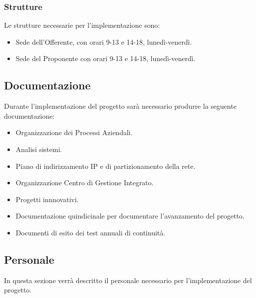             \subsubsection{Strutture}
            	Le strutture necessarie per l'implementazione sono:
               	\begin{itemize}
               		\item Sede dell'Offerente, con orari 9-13 e 14-18, lunedì-venerdì.
                    \item Sede del Proponente con orari 9-13 e 14-18, lunedì-venerdì.
               	\end{itemize}

			\subsection{Documentazione}
            	Durante l'implementazione del progetto sarà necessario produrre la seguente documentazione:
                \begin{itemize}
                	\item Organizzazione dei Processi Aziendali.
					\item Analisi sistemi.
					\item Piano di indirizzamento IP e di partizionamento della rete.
					\item Organizzazione Centro di Gestione Integrato.
					\item Progetti innnovativi.
					\item Documentazione quindicinale per documentare l'avanzamento del progetto.
                    \item Documenti di esito dei test annuali di continuità.
                \end{itemize}
                
			\subsection{Personale}
            	In questa sezione verrà descritto il personale necessario per l'implementazione del progetto.
                
